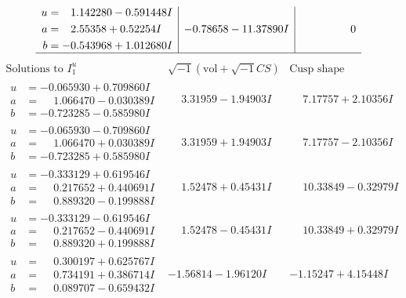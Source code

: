 \documentclass[1p]{elsarticle_modified}
\theoremstyle{definition}
\newcommand{\I}{\sqrt{-1}}
\begin{document}
$$\begin{array}{c|c|c}
\begin{aligned}
u &= \phantom{-}1.142280 - 0.591448 I \\
a &= \phantom{-}2.55358 + 0.52254 I \\
b &= -0.543968 + 1.012680 I\end{aligned}
 & -0.78658 - 11.37890 I & \phantom{-0.000000 } 0\\
 \hline 
 \end{array}$$\newpage$$\begin{array}{c|c|c}  
\text{Solutions to }I^u_{1}& \I (\text{vol} + \sqrt{-1}CS) & \text{Cusp shape}\\
 \hline 
\begin{aligned}
u &= -0.065930 + 0.709860 I \\
a &= \phantom{-}1.066470 - 0.030389 I \\
b &= -0.723285 - 0.585980 I\end{aligned}
 & \phantom{-}3.31959 - 1.94903 I & \phantom{-}7.17757 + 2.10356 I \\ \hline\begin{aligned}
u &= -0.065930 - 0.709860 I \\
a &= \phantom{-}1.066470 + 0.030389 I \\
b &= -0.723285 + 0.585980 I\end{aligned}
 & \phantom{-}3.31959 + 1.94903 I & \phantom{-}7.17757 - 2.10356 I \\ \hline\begin{aligned}
u &= -0.333129 + 0.619546 I \\
a &= \phantom{-}0.217652 + 0.440691 I \\
b &= \phantom{-}0.889320 - 0.199888 I\end{aligned}
 & \phantom{-}1.52478 + 0.45431 I & \phantom{-}10.33849 - 0.32979 I \\ \hline\begin{aligned}
u &= -0.333129 - 0.619546 I \\
a &= \phantom{-}0.217652 - 0.440691 I \\
b &= \phantom{-}0.889320 + 0.199888 I\end{aligned}
 & \phantom{-}1.52478 - 0.45431 I & \phantom{-}10.33849 + 0.32979 I \\ \hline\begin{aligned}
u &= \phantom{-}0.300197 + 0.625767 I \\
a &= \phantom{-}0.734191 + 0.386714 I \\
b &= \phantom{-}0.089707 - 0.659432 I\end{aligned}
 & -1.56814 - 1.96120 I & -1.15247 + 4.15448 I \\ \hline\begin{aligned}

\end{aligned}
\end{array}$$
\end{document}
